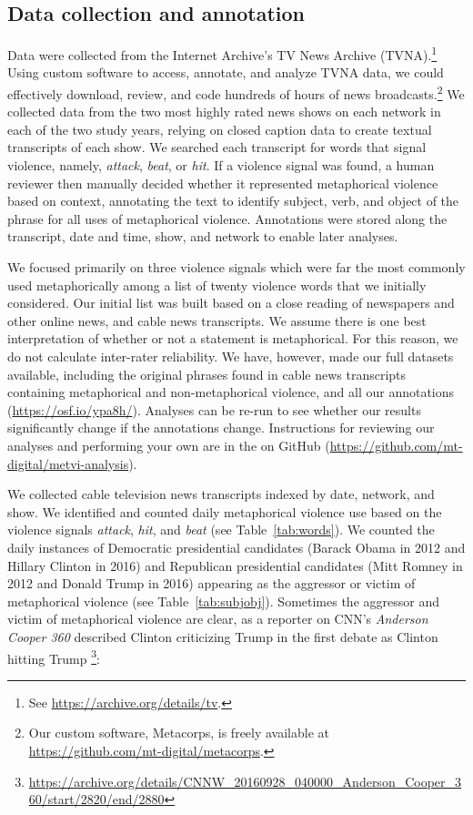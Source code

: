 \subsection{Data collection and annotation}

Data were collected from the Internet Archive's TV News Archive
(TVNA).\footnote{See \url{https://archive.org/details/tv}.} Using custom
software to access, annotate, and analyze TVNA data, we could effectively
download, review, and code hundreds of hours of news broadcasts.\footnote{Our
custom software, Metacorps, is freely available at
\url{https://github.com/mt-digital/metacorps}.} We collected data from the two
most highly rated news shows on each network in each of the two study years,
relying on closed caption data  to create textual transcripts of each show. We
searched each transcript for words that signal violence, namely, \emph{attack},
\emph{beat}, or \emph{hit}. If a violence signal was found, a human reviewer
then manually decided whether it represented metaphorical violence based on
context, annotating the text to identify subject, verb, and object of the phrase
for all uses of metaphorical violence. Annotations were stored along the
transcript, date and time, show, and network to enable later analyses.

We focused primarily on three violence signals which were far the most commonly
used metaphorically among a list of twenty violence words that we initially 
considered. Our initial list was built based on a close reading of newspapers 
and other online news, and cable news transcripts. We assume there is one 
best interpretation of whether or not a statement is metaphorical. For this reason,
we do not calculate inter-rater reliability. We have, however, made our 
full datasets available, including the original phrases found in cable news 
transcripts containing metaphorical and non-metaphorical violence, and all
our annotations (\url{https://osf.io/ypa8h/}). Analyses can be re-run 
to see whether our results significantly change if the annotations change.
Instructions for reviewing our analyses and performing your
own are in the on GitHub 
(\url{https://github.com/mt-digital/metvi-analysis}).

We collected cable television news transcripts indexed by date, network, and
show. We identified and counted daily metaphorical
violence use based on the violence signals \emph{attack}, \emph{hit}, and
\emph{beat} (see Table~\ref{tab:words}). We counted the daily instances of
Democratic presidential candidates (Barack Obama in 2012 and Hillary Clinton in
2016) and Republican presidential candidates (Mitt Romney in 2012 and Donald
Trump in 2016) appearing as the aggressor or victim of metaphorical violence
(see Table~\ref{tab:subjobj}). Sometimes the aggressor and victim of metaphorical 
violence are clear, as a reporter on CNN's \emph{Anderson Cooper 360}
described Clinton criticizing Trump in the first debate as Clinton hitting Trump
\footnote{\url{https://archive.org/details/CNNW_20160928_040000_Anderson_Cooper_360/start/2820/end/2880}}:

